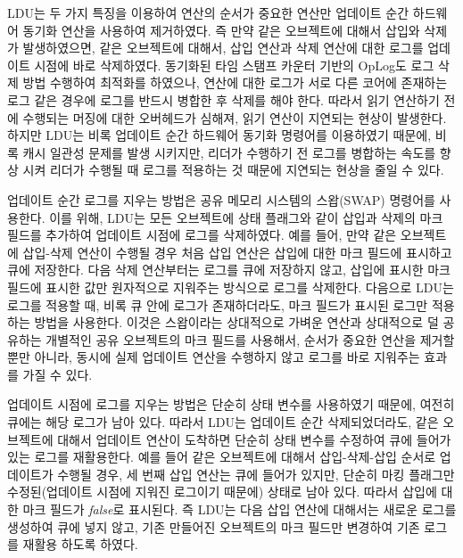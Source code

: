 LDU는 두 가지 특징을 이용하여 연산의 순서가 중요한 연산만 업데이트 순간 하드웨어 
동기화 연산을 사용하여 제거하였다. 
즉 만약 같은 오브젝트에 대해서 삽입와 삭제가 발생하였으면, 
같은 오브젝트에 대해서, 삽입 연산과 삭제 연산에 대한 로그를 업데이트 시점에 바로 삭제하였다. 
동기화된 타임 스탬프 카운터 기반의 OpLog도 로그 삭제 방법 
수행하여 최적화를 하였으나, 연산에 대한 로그가 서로 다른 코어에 존재하는 로그 같은 경우에 
로그를 반드시 병합한 후 삭제를 해야 한다.
따라서 읽기 연산하기 전에 수행되는 머징에 대한 오버헤드가 심해져, 읽기 연산이 지연되는 현상이 발생한다.
하지만 LDU는 비록 업데이트 순간 하드웨어 동기화 명령어를 이용하였기 때문에,
비록 캐시 일관성 문제를 발생 시키지만, 리더가 수행하기 전 로그를 병합하는 속도를 향상 시켜 
리더가 수행될 때 로그를 적용하는 것 때문에 지연되는 현상을 줄일 수 있다.

업데이트 순간 로그를 지우는 방법은 공유 메모리 시스템의 스왑(SWAP) 명령어를 사용한다.
이를 위해, LDU는 모든 오브젝트에 상태 플래그와 같이 삽입과 삭제의 마크 필드를 추가하여
업데이트 시점에 로그를 삭제하였다. 
예를 들어, 만약 같은 오브젝트에 삽입-삭제 연산이 수행될 경우 처음 삽입 연산은
삽입에 대한 마크 필드에 표시하고 큐에 저장한다. 
다음 삭제 연산부터는 로그를 큐에 저장하지 않고, 삽입에 표시한 마크 필드에 표시한 값만
원자적으로 지워주는 방식으로 로그를 삭제한다.
다음으로 LDU는 로그를 적용할 때, 비록 큐 안에 로그가 존재하더라도, 마크 필드가 표시된 로그만 적용하는 방법을 사용한다.
이것은 스왑이라는 상대적으로 가벼운 연산과 상대적으로 덜 공유하는 개별적인 공유 오브젝트의
마크 필드를 사용해서, 순서가 중요한 연산을 제거할 뿐만 아니라, 동시에 실제
업데이트 연산을 수행하지 않고 로그를 바로 지워주는 효과를 가질 수 있다. 

업데이트 시점에 로그를 지우는 방법은 단순히 상태 변수를 사용하였기 때문에, 여전히 큐에는 해당 
로그가 남아 있다.
따라서 LDU는 업데이트 순간 삭제되었더라도, 같은 오브젝트에 대해서 업데이트 연산이 도착하면
단순히 상태 변수를 수정하여 큐에 들어가 있는 로그를 재활용한다.
예를 들어 같은 오브젝트에 대해서 삽입-삭제-삽입 순서로 업데이트가 수행될 경우, 
세 번째 삽입 연산는 큐에 들어가 있지만, 단순히 마킹 플래그만 
수정된(업데이트 시점에 지워진 로그이기 때문에) 상태로 남아 있다. 
따라서 삽입에 대한 마크 필드가 \textit{false}로 표시된다. 
즉 LDU는 다음 삽입 연산에 대해서는 새로운 로그를 생성하여 큐에 넣지 않고, 
기존 만들어진 오브젝트의 마크 필드만 변경하여 기존 로그를 재활용 하도록 하였다.

